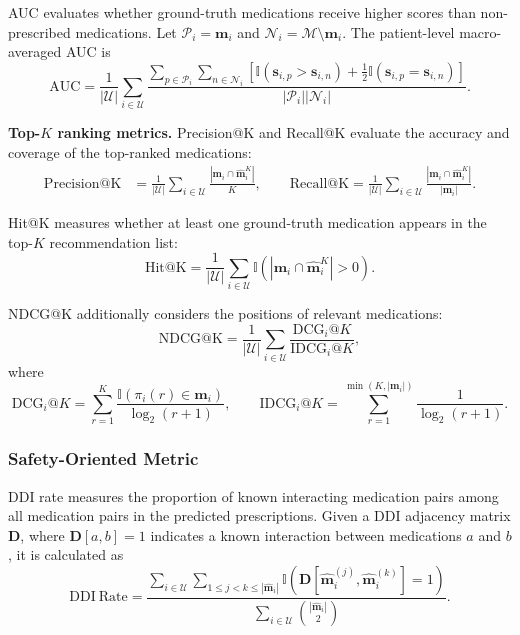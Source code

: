 \documentclass[manuscript,review]{acmart}
\begin{document}
AUC evaluates whether ground-truth medications receive higher scores than non-prescribed medications. Let $\mathcal{P}_i=\mathbf{m}_i$ and $\mathcal{N}_i=\mathcal{M}\setminus\mathbf{m}_i$. The patient-level macro-averaged AUC is
\begin{equation}
\mathrm{AUC}
=
\frac{1}{|\mathcal{U}|}
\sum_{i\in\mathcal{U}}
\frac{
\displaystyle
\sum_{p\in\mathcal{P}_i}
\sum_{n\in\mathcal{N}_i}
\left[
\mathbb{I}\left(\mathbf{s}_{i,p}>\mathbf{s}_{i,n}\right)
+
\frac{1}{2}
\mathbb{I}\left(\mathbf{s}_{i,p}=\mathbf{s}_{i,n}\right)
\right]
}{
|\mathcal{P}_i||\mathcal{N}_i|
}.
\end{equation}

\textbf{Top-$K$ ranking metrics.}
Precision@K and Recall@K evaluate the accuracy and coverage of the top-ranked medications:
\begin{align}
\mathrm{Precision@K}
&=
\frac{1}{|\mathcal{U}|}
\sum_{i\in\mathcal{U}}
\frac{
|\mathbf{m}_i\cap\hat{\mathbf{m}}_i^K|
}{K},
\qquad
\mathrm{Recall@K}=
\frac{1}{|\mathcal{U}|}
\sum_{i\in\mathcal{U}}
\frac{
|\mathbf{m}_i\cap\hat{\mathbf{m}}_i^K|
}{
|\mathbf{m}_i|
}.
\end{align}

Hit@K measures whether at least one ground-truth medication appears in the top-$K$ recommendation list:
\begin{equation}
\mathrm{Hit@K}
=
\frac{1}{|\mathcal{U}|}
\sum_{i\in\mathcal{U}}
\mathbb{I}
\left(
|\mathbf{m}_i\cap\hat{\mathbf{m}}_i^K|>0
\right).
\end{equation}

NDCG@K additionally considers the positions of relevant medications:
\begin{equation}
\mathrm{NDCG@K}
=
\frac{1}{|\mathcal{U}|}
\sum_{i\in\mathcal{U}}
\frac{
\mathrm{DCG}_i@K
}{
\mathrm{IDCG}_i@K
},
\end{equation}
where
\begin{equation}
\mathrm{DCG}_i@K
=
\sum_{r=1}^{K}
\frac{
\mathbb{I}\left(\pi_i(r)\in\mathbf{m}_i\right)
}{
\log_2(r+1)
},
\qquad
\mathrm{IDCG}_i@K
=
\sum_{r=1}^{\min(K,|\mathbf{m}_i|)}
\frac{1}{
\log_2(r+1)
}.
\end{equation}

\subsubsection{Safety-Oriented Metric}

DDI rate measures the proportion of known interacting medication pairs among all medication pairs in the predicted prescriptions. Given a DDI adjacency matrix $\mathbf{D}$, where $\mathbf{D}[a,b]=1$ indicates a known interaction between medications $a$ and $b$, it is calculated as
\begin{equation}
\mathrm{DDI\ Rate}
=
\frac{
\displaystyle
\sum_{i\in\mathcal{U}}
\sum_{1\leq j<k\leq|\hat{\mathbf{m}}_i|}
\mathbb{I}
\left(
\mathbf{D}
\left[
\hat{\mathbf{m}}_i^{(j)},
\hat{\mathbf{m}}_i^{(k)}
\right]
=1
\right)
}{
\displaystyle
\sum_{i\in\mathcal{U}}
\binom{|\hat{\mathbf{m}}_i|}{2}
}.
\end{equation}
\end{document}
